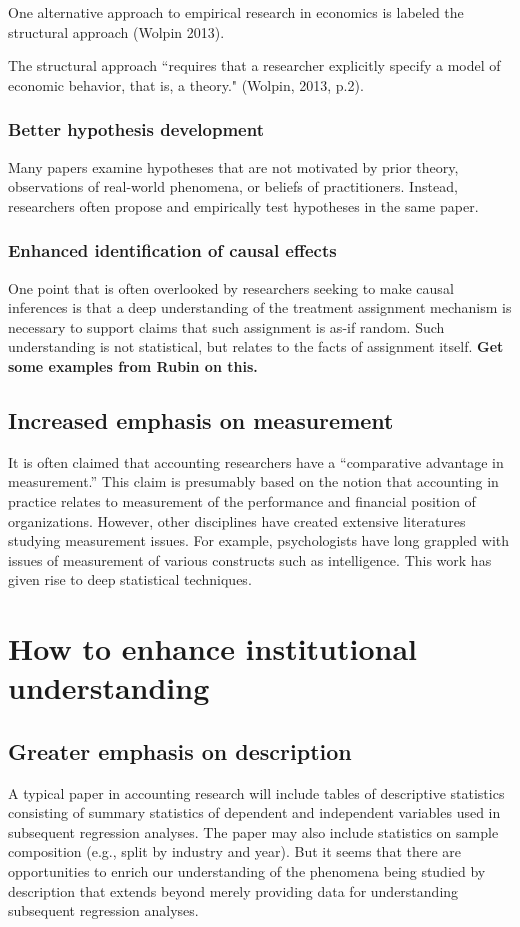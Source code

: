 \documentclass[11pt]{amsart}
\begin{document}
One alternative approach to empirical research in economics is labeled the structural approach (Wolpin 2013).

The structural approach ``requires that a researcher explicitly specify a model of economic behavior, that is, a theory." (Wolpin, 2013, p.2).


\subsubsection{Better hypothesis development}
Many papers examine hypotheses that are not motivated by prior theory,  observations of real-world phenomena, or beliefs of practitioners. Instead, researchers often propose and empirically test hypotheses in the same paper.

\subsubsection{Enhanced identification of causal effects}
One point that is often overlooked by researchers seeking to make causal inferences is that a deep understanding of the treatment assignment mechanism is necessary to support claims that such assignment is as-if random. Such understanding is not statistical, but relates to the facts of assignment itself. \textbf{Get some examples from Rubin on this.}

\subsection{Increased emphasis on measurement}
It is often claimed that accounting researchers have a ``comparative advantage in measurement.'' This claim is presumably based on the notion that accounting in practice relates to measurement of the performance and financial position of organizations. However, other disciplines have created extensive literatures studying measurement issues. For example, psychologists have long grappled with issues of measurement of various constructs such as intelligence. This work has given rise to deep statistical techniques.

\section{How to enhance institutional understanding}

\subsection{Greater emphasis on description}
A typical paper in accounting research will include tables of descriptive statistics consisting of summary statistics of dependent and independent variables used in subsequent regression analyses. The paper may also include statistics on sample composition (e.g., split by industry and year). But it seems that there are opportunities to enrich our understanding of the phenomena being studied by description that extends beyond merely providing data for understanding subsequent regression analyses.
\end{document}
